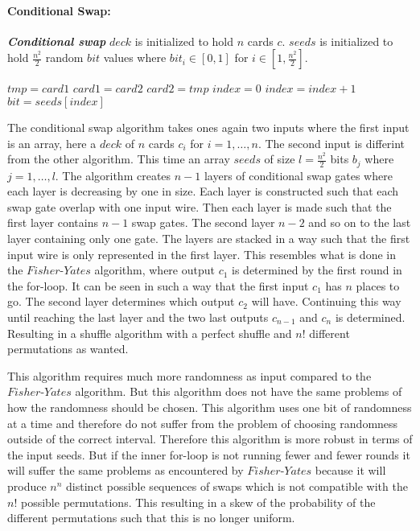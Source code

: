 \bigskip

\paragraph{Conditional Swap:}
\begin{algorithm}
\caption{\textbf{\textit{Conditional swap}} \newline
    $deck$ is initialized to hold $n$ cards $c$. \newline
    $seeds$ is initialized to hold $\frac{n^2}{2}$ random $bit$ values where $bit_i\in[0,1]$ for $i\in [1,\frac{n^2}{2}]$.
}
\label{con_swap_alg}

\begin{algorithmic}[1]
\State $tmp = card1$
\State $card1 = card2$
\State $card2 = tmp$
\EndIf
\EndFunction
\State
{}
\State $index = 0$
\State $index = index + 1$
\State $bit = seeds[index]$
\State {}
\EndFor
\EndFor
\EndFunction
\end{algorithmic}
\end{algorithm}


The conditional swap algorithm takes ones again two inputs where the first input is an array, here a $deck$ of $n$ cards $c_i$ for $i=1,\dots,n$. The second input is differint from the other algorithm. This time an array $seeds$ of size $l=\frac{n^2}{2}$ bits $b_j$ where $j=1,\dots, l$. The algorithm creates $n-1$ layers of conditional swap gates where each layer is decreasing by one in size. Each layer is constructed such that each swap gate overlap with one input wire. Then each layer is made such that the first layer contains $n-1$ swap gates. The second layer $n-2$ and so on to the last layer containing only one gate. The layers are stacked in a way such that the first input wire is only represented in the first layer. This resembles what is done in the $Fisher\text{-}Yates$ algorithm, where output $c_1$ is determined by the first round in the for-loop. It can be seen in such a way that the first input $c_1$ has $n$ places to go. The second layer determines which output $c_2$ will have. Continuing this way until reaching the last layer and the two last outputs $c_{n-1}$ and $c_n$ is determined. Resulting in a shuffle algorithm with a perfect shuffle and $n!$ different permutations as wanted.

This algorithm requires much more randomness as input compared to the $Fisher\text{-}Yates$ algorithm. But this algorithm does not have the same problems of how the randomness should be chosen. This algorithm uses one bit of randomness at a time and therefore do not suffer from the problem of choosing randomness outside of the correct interval. Therefore this algorithm is more robust in terms of the input seeds. But if the inner for-loop is not running fewer and fewer rounds it will suffer the same problems as encountered by $Fisher\text{-}Yates$ because it will produce $n^n$ distinct possible sequences of swaps which is not compatible with the $n!$ possible permutations. This resulting in a skew of the probability of the different permutations such that this is no longer uniform.

